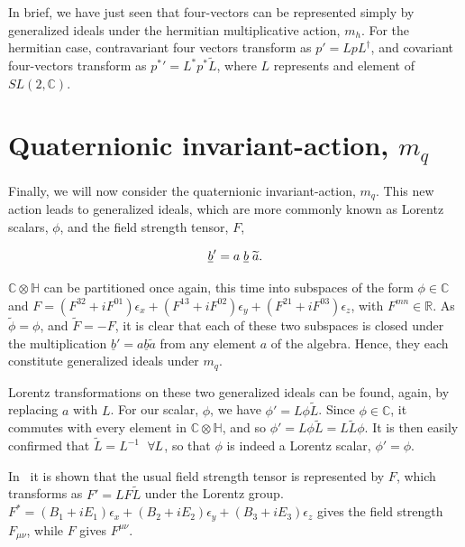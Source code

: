 \documentclass[letterpaper,12pt,titlepage,oneside,final]{book}
\newcommand{\CH}{\mathbb{C}\otimes\mathbb{H}}
\begin{document}
\vspace{1cm}


In brief, we have just seen that four-vectors can be represented simply by generalized ideals under the hermitian multiplicative action, $m_h$.  For the hermitian case, contravariant four vectors transform as $p'= LpL^{\dagger}$, and covariant four-vectors transform as ${p^*}'= L^*p^*\widetilde{L}$, where $L$ represents and element of $SL(2, \mathbb{C})$.


\section{Quaternionic invariant-action, $m_q$\label{mq}  }

Finally, we will now consider the quaternionic invariant-action, $m_q$.  This new action leads to generalized ideals, which are more commonly known as Lorentz scalars, $\phi$, and the field strength tensor, $F$,

\begin{equation} \underline{b} ' = a\hspace{1mm}\underline{b} \hspace{1mm}\widetilde{a}.
\end{equation}

$\mathbb{C}\otimes\mathbb{H}$ can be partitioned once again, this time into subspaces of the form $\phi \in \mathbb{C} $ and $F = \left( F^{32} +iF^{01}\right){\epsilon_x} + \left( F^{13}+iF^{02} \right){\epsilon_y}  + \left( F^{21}+iF^{03}  \right){\epsilon_z}  $, with $F^{mn} \in \mathbb{R}$.  As $\widetilde{\phi} = \phi$, and $\widetilde{F} = -F$, it is clear that each of these two subspaces is closed under the multiplication $\underline{b}' = a \underline{b} \widetilde{a}$ from any element $a$ of the algebra.  Hence, they each constitute generalized ideals under $m_q$.

Lorentz transformations on these two generalized ideals can be found, again, by replacing $a$ with $L$.  For our scalar, $\phi$, we have $\phi' = L \phi \widetilde{L}$.  Since $\phi \in \mathbb{C}$, it commutes with every element in $\CH$, and so $\phi' = L \phi \widetilde{L} =  L\widetilde{L} \phi$.  It is then easily confirmed that $\widetilde{L} = L^{-1}$ $\hspace{1mm}\forall L$, so that $\phi$ is indeed a Lorentz scalar, $\phi' = \phi$.

In~\cite{gs} it is shown that the usual field strength tensor is represented by $F$, which transforms as $F' = L F \widetilde{L} $ under the Lorentz group.  $F ^* = \left( B_1 +iE_1\right){\epsilon_x} + \left( B_2+iE_2 \right){\epsilon_y}  + \left( B_3+iE_3  \right){\epsilon_z} $ gives the  field strength $F_{\mu\nu}$, while $F $ gives $F^{\mu\nu}$.  
\end{document}
